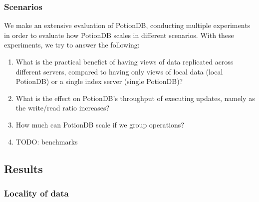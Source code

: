 \documentclass{vldb}
\newcommand{\grumbler}[2]{{\color{red}{\bf #1:} #2}}
\newcommand{\andre}[1]{\grumbler{andre}{#1}}
\begin{document}
\subsubsection{Scenarios}

We make an extensive evaluation of PotionDB, conducting multiple experiments in order to evaluate how PotionDB scales in different scenarios. %
With these experiments, we try to answer the following:

\begin{enumerate}
	\item \label{enum:question1} What is the practical benefict of having views of data replicated across different servers, compared to having only views of local data (local PotionDB) or a single index server (single PotionDB)?
	\item \label{enum:question2}What is the effect on PotionDB's throughput of executing updates, namely as the write/read ratio increases?
	\item \label{enum:question3}How much can PotionDB scale if we group operations?
	\item \label{enum:question4}\andre{TODO: benchmarks}
\end{enumerate}

\subsection{Results}

\subsubsection{Locality of data}
\end{document}
